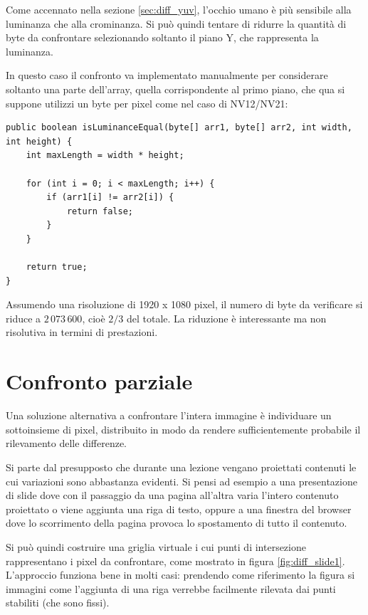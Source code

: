 Come accennato nella sezione \ref{sec:diff_yuv}, l'occhio umano è più sensibile alla luminanza che alla crominanza. Si può quindi tentare di ridurre la quantità di byte da confrontare selezionando soltanto il piano Y, che rappresenta la luminanza.

In questo caso il confronto va implementato manualmente per considerare soltanto una parte dell'array, quella corrispondente al primo piano, che qua si suppone utilizzi un byte per pixel come nel caso di NV12/NV21:

\begin{verbatim}
public boolean isLuminanceEqual(byte[] arr1, byte[] arr2, int width, int height) {
    int maxLength = width * height;
    
    for (int i = 0; i < maxLength; i++) {
        if (arr1[i] != arr2[i]) {
            return false;
        }
    }
    
    return true;
}
\end{verbatim}

Assumendo una risoluzione di 1920 x 1080 pixel, il numero di byte da verificare si riduce a $2\,073\,600$, cioè $2/3$ del totale. La riduzione è interessante ma non risolutiva in termini di prestazioni.

\section{Confronto parziale}
\label{sec:diff_parziale}

Una soluzione alternativa a confrontare l'intera immagine è individuare un sottoinsieme di pixel, distribuito in modo da rendere sufficientemente probabile il rilevamento delle differenze.

Si parte dal presupposto che durante una lezione vengano proiettati contenuti le cui variazioni sono abbastanza evidenti. Si pensi ad esempio a una presentazione di slide dove con il passaggio da una pagina all'altra varia l'intero contenuto proiettato o viene aggiunta una riga di testo, oppure a una finestra del browser dove lo scorrimento della pagina provoca lo spostamento di tutto il contenuto.

Si può quindi costruire una griglia virtuale i cui punti di intersezione rappresentano i pixel da confrontare, come mostrato in figura \ref{fig:diff_slide1}. L'approccio funziona bene in molti casi: prendendo come riferimento la figura si immagini come l'aggiunta di una riga verrebbe facilmente rilevata dai punti stabiliti (che sono fissi).

